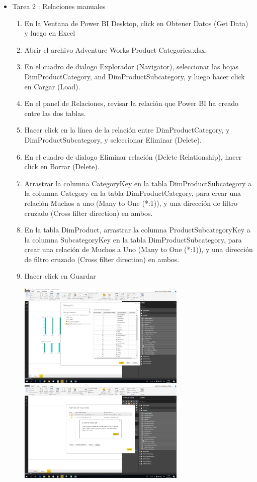 \begin{itemize}
\begin{enumerate}
\end{enumerate}



\item Tarea 2 :   Relaciones manuales


\begin{enumerate}

\item En la Ventana de Power BI Desktop, click en Obtener Datos (Get Data) y luego en Excel
\item Abrir el archivo Adventure Works Product Categories.xlsx.
\item En el cuadro de dialogo Explorador (Navigator), seleccionar las hojas DimProductCategory, and
DimProductSubcategory, y luego hacer click en Cargar (Load).
\item En el panel de Relaciones, revisar la relación que Power BI ha creado entre las dos tablas.
\item Hacer click en la línea de la relación entre DimProductCategory, y DimProductSubcategory, y seleccionar
Eliminar (Delete).
\item En el cuadro de dialogo Eliminar relación (Delete Relationship), hacer click en Borrar (Delete).
\item Arrastrar la columna CategoryKey en la tabla DimProductSubcategory a la columna Category en la tabla
DimProductCategory, para crear una relación Muchos a uno (Many to One (*:1)), y una dirección de filtro
cruzado (Cross filter
direction) en ambos.
\item En la tabla DimProduct, arrastrar la columna ProductSubcategoryKey a la columna SubcategoryKey en la
tabla DimProductSubcategory, para crear una relación de Muchos a Uno (Many to One (*:1)), y una
dirección de filtro cruzado (Cross filter direction) en ambos.
\item Hacer click en Guardar

\includegraphics[width=8cm]{./Imagenes/8.png} \includegraphics[width=8cm]{./Imagenes/9.png}


\end{enumerate}
\end{itemize}

